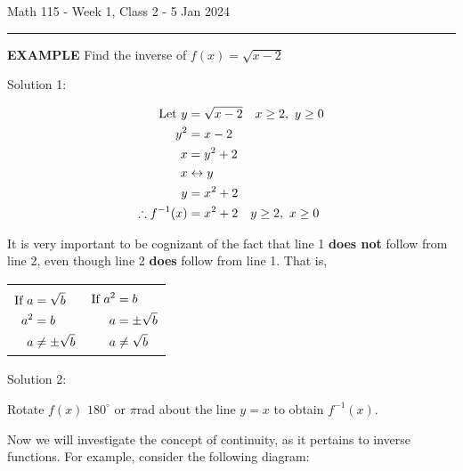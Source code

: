 \documentclass{article}
\begin{document}
Math 115 - Week 1, Class 2 - 5 Jan 2024
\hrule

\vspace{10pt}

{\bf{}EXAMPLE} Find the inverse of $f(x)=\sqrt{x-2}$

\vspace{10pt}

Solution 1:

\begin{align*}
\textnormal{Let }y&=\sqrt{x-2}\quad x\geq2,\ y\geq0\\
y^2&=x-2\\
x&=y^2+2\\
x&\leftrightarrow y\\
y&=x^2+2\\
\therefore f^{-1}(x)&=x^2+2\quad y\geq2,\ x\geq0
\end{align*}

It is very important to be cognizant of the fact that line 1 {\bf{}does not} follow from line 2, even though line 2 {\bf{}does} follow from line 1. That is,

\begin{center}
\begin{tabular}{|ll|}
\hline&\\
$\begin{aligned}[t]
\textnormal{If }a&=\sqrt{b}\\
a^2&=b\\
a&\neq\pm\sqrt{b}\\
\end{aligned}$
&
$\begin{aligned}[t]
\textnormal{If }a^2&=b\\
a&=\pm\sqrt{b}\\
a&\neq\sqrt{b}\\
\end{aligned}$\\[4.5em]
\hline
\end{tabular}
\end{center}

Solution 2:

Rotate $f(x)$ $180^\circ$ or $\pi$rad about the line $y=x$ to obtain $f^{-1}(x)$.

\vspace{10pt}

Now we will investigate the concept of continuity, as it pertains to inverse functions. For example, consider the following diagram:
\end{document}
